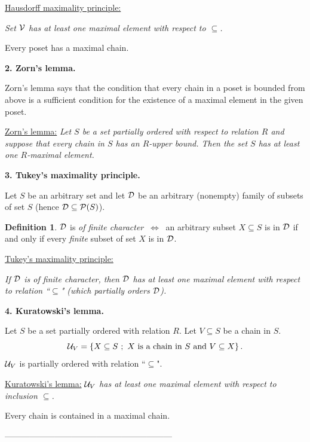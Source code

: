 \documentclass[11pt,paper=b5,footinclude,headinclude]{scrbook} %
\def\cee {{~\Leftrightarrow~}}
\theoremstyle{remark}
\theoremstyle{definition} %
\newtheorem*{definition}{Definition}
\theoremstyle{theorem} %
\begin{document}
\bigskip
\underline{Hausdorff maximality principle:}

{\em Set  ${\cal V}$ has at least one maximal element with respect to $\subseteq$.}

Every poset has a maximal chain.

\bigskip
\textbf{ 2. Zorn's lemma.}

Zorn's lemma says that the condition that every chain in a poset is bounded from above is a sufficient condition for the existence of a maximal element
in the given poset.

\medskip
\underline{Zorn's lemma:} {\em Let $S$ be a set partially ordered with respect to relation $R$
and suppose that every chain in $S$ has an $R$-upper bound.
Then the set $S$ has at least one $R$-maximal element.}

\bigskip
\bigskip
\textbf{ 3. Tukey's maximality principle.}

Let $S$ be an arbitrary set and let ${\cal D}$ be an arbitrary (nonempty) family of subsets of set $S$
(hence ${\cal D}\subseteq {\cal P}(S)$).

\begin{definition}
${\cal D}$ is {\em of finite character} $\cee$ an arbitrary subset $X\subseteq S$ is in ${\cal D}$ if and only if every {\em finite} subset of set $X$
is in ${\cal D}$.
\end{definition}

%

\bigskip
\underline{Tukey's maximality principle:}

{\em If ${\cal D}$ is of finite character, then ${\cal D}$
has at least one maximal element with respect to relation ``$\subseteq$" (which partially orders ${\cal D}$).}

\bigskip

\textbf{ 4. Kuratowski's lemma.}

Let $S$ be a set partially ordered with relation $R$.
Let $V\subseteq S$ be a chain in $S$.
$${\cal U}_V = \{X\subseteq S~;~X\textrm{ is a chain in }S \textrm{ and } V\subseteq X\}\,.$$
${\cal U}_V$ is partially ordered with relation ``$\subseteq$".

\underline{Kuratowski's lemma:}
{\em ${\cal U}_V$ has at least one maximal element with respect to inclusion $\subseteq$.}

\medskip
Every chain is contained in a maximal chain.

------------------------------------------------------------
\end{document}
